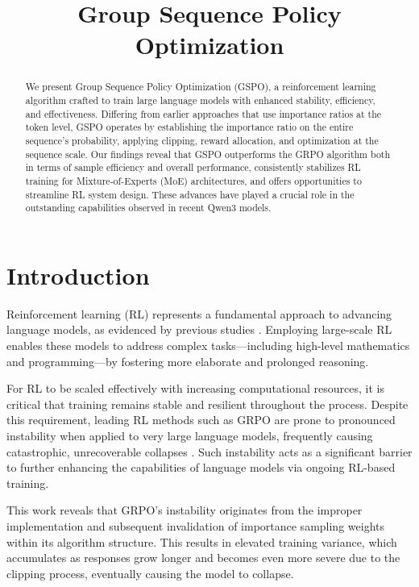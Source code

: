 \title{Group Sequence Policy Optimization}

\begin{abstract}
We present Group Sequence Policy Optimization (GSPO), a reinforcement learning algorithm crafted to train large language models with enhanced stability, efficiency, and effectiveness. Differing from earlier approaches that use importance ratios at the token level, GSPO operates by establishing the importance ratio on the entire sequence's probability, applying clipping, reward allocation, and optimization at the sequence scale. Our findings reveal that GSPO outperforms the GRPO algorithm both in terms of sample efficiency and overall performance, consistently stabilizes RL training for Mixture-of-Experts (MoE) architectures, and offers opportunities to streamline RL system design. These advances have played a crucial role in the outstanding capabilities observed in recent Qwen3 models.
\end{abstract}

\section{Introduction}
\label{sec:intro}

Reinforcement learning (RL) represents a fundamental approach to advancing language models, as evidenced by previous studies \citep{o1,dpsk-r1,qwq32b,qwen3}. Employing large-scale RL enables these models to address complex tasks—including high-level mathematics and programming—by fostering more elaborate and prolonged reasoning.

For RL to be scaled effectively with increasing computational resources, it is critical that training remains stable and resilient throughout the process. Despite this requirement, leading RL methods such as GRPO \citep{grpo} are prone to pronounced instability when applied to very large language models, frequently causing catastrophic, unrecoverable collapses \citep{qwen3, minimax-m1}. Such instability acts as a significant barrier to further enhancing the capabilities of language models via ongoing RL-based training.

This work reveals that GRPO's instability originates from the improper implementation and subsequent invalidation of importance sampling weights within its algorithm structure. This results in elevated training variance, which accumulates as responses grow longer and becomes even more severe due to the clipping process, eventually causing the model to collapse.

